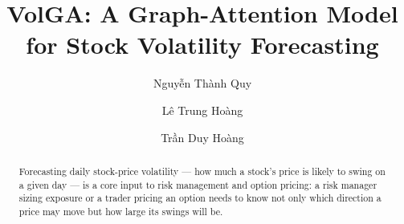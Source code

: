 \documentclass{llncs}
\begin{document}
\title{VolGA: A Graph-Attention Model for Stock Volatility Forecasting}

\author{Nguyễn Thành Quy \and Lê Trung Hoàng \and Trần Duy Hoàng}

\maketitle

\begin{abstract}
Forecasting daily stock-price volatility --- how much a stock's price is likely to swing on a given
day --- is a core input to risk management and option pricing: a risk manager sizing exposure or a
trader pricing an option needs to know not only which direction a price may move but how large its swings will
be.


\end{abstract}
\end{document}
